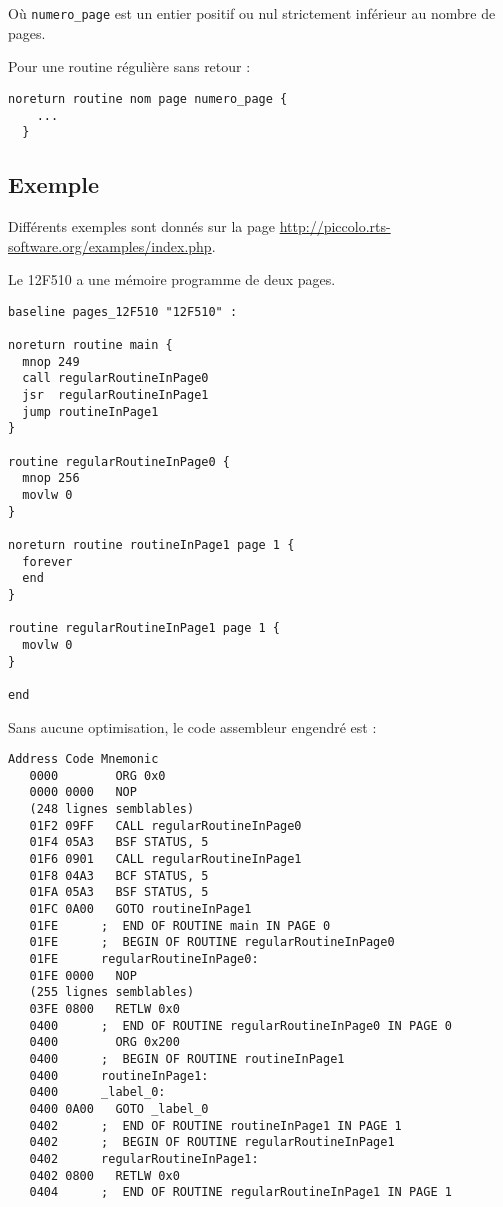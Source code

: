 Où \texttt{numero\_page} est un entier positif ou nul strictement inférieur au nombre de pages.

Pour une routine régulière sans retour :
\begin{lstlisting}[language=piccolo]
  noreturn routine nom page numero_page {
    ...
  }
\end{lstlisting}

\subsection{Exemple}

Différents exemples sont donnés sur la page \url{http://piccolo.rts-software.org/examples/index.php}.

Le 12F510 a une mémoire programme de deux pages. 

\begin{lstlisting}[language=piccolo]
baseline pages_12F510 "12F510" :

noreturn routine main {
  mnop 249
  call regularRoutineInPage0
  jsr  regularRoutineInPage1
  jump routineInPage1
}

routine regularRoutineInPage0 {
  mnop 256
  movlw 0
}

noreturn routine routineInPage1 page 1 {
  forever
  end
}

routine regularRoutineInPage1 page 1 {
  movlw 0
}

end
\end{lstlisting}

Sans aucune optimisation, le code assembleur engendré est :

\begin{lstlisting}[language=assembleur]
Address Code Mnemonic
   0000        ORG 0x0
   0000 0000   NOP
   (248 lignes semblables)
   01F2 09FF   CALL regularRoutineInPage0
   01F4 05A3   BSF STATUS, 5
   01F6 0901   CALL regularRoutineInPage1
   01F8 04A3   BCF STATUS, 5
   01FA 05A3   BSF STATUS, 5
   01FC 0A00   GOTO routineInPage1
   01FE      ;  END OF ROUTINE main IN PAGE 0
   01FE      ;  BEGIN OF ROUTINE regularRoutineInPage0
   01FE      regularRoutineInPage0:
   01FE 0000   NOP
   (255 lignes semblables)
   03FE 0800   RETLW 0x0
   0400      ;  END OF ROUTINE regularRoutineInPage0 IN PAGE 0
   0400        ORG 0x200
   0400      ;  BEGIN OF ROUTINE routineInPage1
   0400      routineInPage1:
   0400      _label_0:
   0400 0A00   GOTO _label_0
   0402      ;  END OF ROUTINE routineInPage1 IN PAGE 1
   0402      ;  BEGIN OF ROUTINE regularRoutineInPage1
   0402      regularRoutineInPage1:
   0402 0800   RETLW 0x0
   0404      ;  END OF ROUTINE regularRoutineInPage1 IN PAGE 1
\end{lstlisting}








